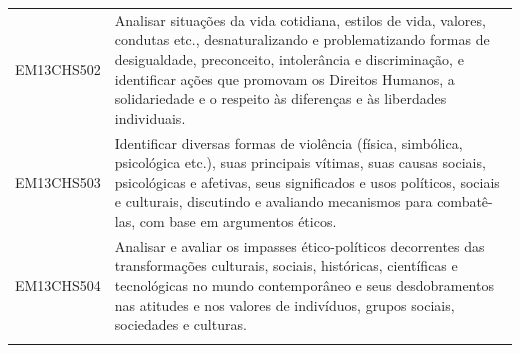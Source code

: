 \documentclass[12pt]{extarticle}
\begin{document}
\begin{longtable}{ll}
EM13CHS502 & Analisar situações da vida cotidiana, estilos de vida, valores, condutas etc., desnaturalizando e problematizando formas de desigualdade, preconceito, intolerância e discriminação, e identificar ações que promovam os Direitos Humanos, a solidariedade e o respeito às diferenças e às liberdades individuais.                                                                                                                                                                                                                                                                                                                                                                                                                                                                                                    \\
\rowcolor[HTML]{E0F7FA} 
EM13CHS503 & Identificar diversas formas de violência (física, simbólica, psicológica etc.), suas principais vítimas, suas causas sociais, psicológicas e afetivas, seus significados e usos políticos, sociais e culturais, discutindo e avaliando mecanismos para combatê-las, com base em argumentos éticos.                                                                                                                                                                                                                                                                                                                                                                                                                                                                                                                    \\
\rowcolor[HTML]{FFF} 
EM13CHS504 & Analisar e avaliar os impasses ético-políticos decorrentes das transformações culturais, sociais, históricas, científicas e tecnológicas no mundo contemporâneo e seus desdobramentos nas atitudes e nos valores de indivíduos, grupos sociais, sociedades e culturas.                                                                                                                                                                                                                                                                                                                                                                                                                                                                                                                                                \\
\rowcolor[HTML]{E0F7FA} 

\end{longtable}
\end{document}
